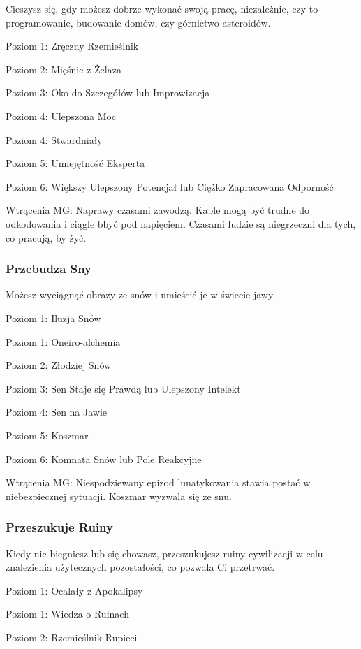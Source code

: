 Cieszysz się, gdy możesz dobrze wykonać swoją pracę, niezależnie, czy to programowanie, budowanie domów, czy górnictwo asteroidów.

Poziom 1: Zręczny Rzemieślnik

Poziom 2: Mięśnie z Żelaza

Poziom 3: Oko do Szczegółów lub Improwizacja

Poziom 4: Ulepszona Moc

Poziom 4: Stwardniały

Poziom 5: Umiejętność Eksperta

Poziom 6: Większy Ulepszony Potencjał lub  Ciężko Zapracowana Odporność

Wtrącenia MG: Naprawy czasami zawodzą. Kable mogą być trudne do odkodowania i ciągle bbyć pod napięciem. Czasami ludzie są niegrzeczni dla tych, co pracują, by żyć. 

\subsubsection{Przebudza Sny}

Możesz wyciągnąć obrazy ze snów i umieścić je w świecie jawy.

Poziom 1: Iluzja Snów

Poziom 1: Oneiro-alchemia

Poziom 2: Złodziej Snów

Poziom 3: Sen Staje się Prawdą lub Ulepszony Intelekt

Poziom 4: Sen na Jawie

Poziom 5: Koszmar

Poziom 6: Komnata Snów lub Pole Reakcyjne

Wtrącenia MG: Niespodziewany epizod lunatykowania stawia postać w niebezpiecznej sytuacji. Koszmar wyzwala się ze snu.

\subsubsection{Przeszukuje Ruiny}

Kiedy nie biegniesz lub się chowasz, przeszukujesz ruiny cywilizacji w celu znalezienia użytecznych pozostałości, co pozwala Ci przetrwać. 

Poziom 1: Ocalały z Apokalipsy

Poziom 1: Wiedza o Ruinach

Poziom 2: Rzemieślnik Rupieci

